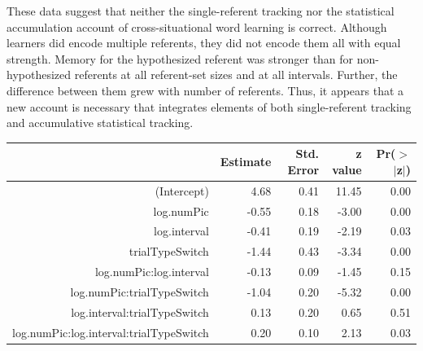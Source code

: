 \documentclass[man,floatsintext]{apa6}
\begin{document}
These data suggest that neither the single-referent tracking nor the statistical accumulation account of cross-situational word learning is correct. Although learners did encode multiple referents, they did not encode them all with equal strength. Memory for the hypothesized referent was stronger than for non-hypothesized referents at all referent-set sizes and at all intervals. Further, the difference between them grew with number of referents. Thus, it appears that a new account is necessary that integrates elements of both single-referent tracking and accumulative statistical tracking.

\vspace{12 pt}

\begin{table}[ht]
\centering
\begin{tabular}{rrrrr}
  \hline
 & Estimate & Std. Error & z value & Pr($>$$|$z$|$) \\ 
  \hline
(Intercept) & 4.68 & 0.41 & 11.45 & 0.00 \\ 
  log.numPic & -0.55 & 0.18 & -3.00 & 0.00 \\ 
  log.interval & -0.41 & 0.19 & -2.19 & 0.03 \\ 
  trialTypeSwitch & -1.44 & 0.43 & -3.34 & 0.00 \\ 
  log.numPic:log.interval & -0.13 & 0.09 & -1.45 & 0.15 \\ 
  log.numPic:trialTypeSwitch & -1.04 & 0.20 & -5.32 & 0.00 \\ 
  log.interval:trialTypeSwitch & 0.13 & 0.20 & 0.65 & 0.51 \\ 
  log.numPic:log.interval:trialTypeSwitch & 0.20 & 0.10 & 2.13 & 0.03 \\ 
   \hline
\end{tabular}
\label{tab:exp1_reg}
\end{table}
%
\end{document}
